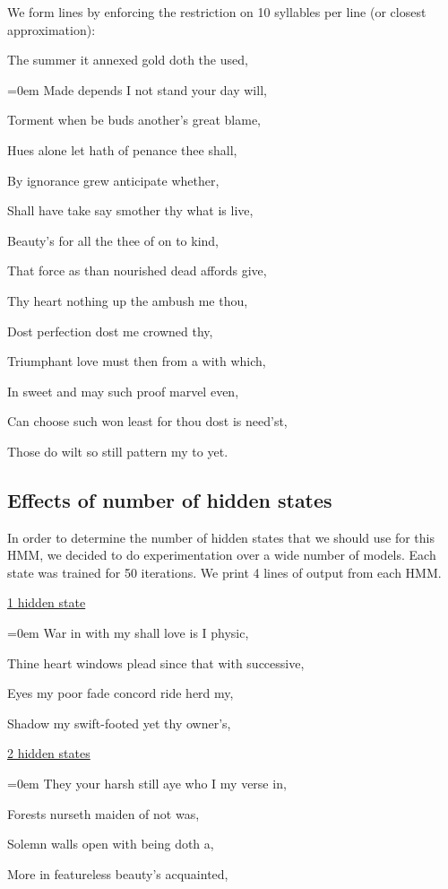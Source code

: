 We form lines by enforcing the restriction on 10 syllables per line (or closest approximation):


The summer it annexed gold doth the used,

{\parskip=0em 
Made depends I not stand your day will,

Torment when be buds another's great blame,

Hues alone let hath of penance thee shall,

By ignorance grew anticipate whether,

Shall have take say smother thy what is live,

Beauty's for all the thee of on to kind,

That force as than nourished dead affords give,

Thy heart nothing up the ambush me thou,

Dost perfection dost me crowned thy,

Triumphant love must then from a with which,

In sweet and may such proof marvel even,

Can choose such won least for thou dost is need'st,

Those do wilt so still pattern my to yet.
}

\subsection*{Effects of number of hidden states}
In order to determine the number of hidden states that we should use for this HMM, we decided to do experimentation over a wide number of models. Each state was trained for 50 iterations. We print 4 lines of output from each HMM.

\underline{1 hidden state}

{\parskip=0em 
War in with my shall love is I physic,

Thine heart windows plead since that with successive,

Eyes my poor fade concord ride herd my,

Shadow my swift-footed yet thy owner's,}

\underline{2 hidden states}

{\parskip=0em 
They your harsh still aye who I my verse in,

Forests nurseth maiden of not was,

Solemn walls open with being doth a,

More in featureless beauty's acquainted,}

